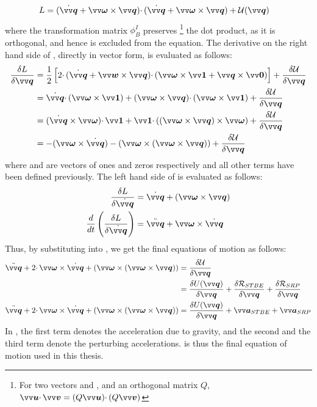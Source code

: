 \begin{align}
    L &= (\dot{\bv{q}} + \bv{\omega} \times \bv{q}) \cdotp (\dot{\bv{q}} + \bv{\omega} \times \bv{q}) + \mathcal{U}(\bv{q})
    \label{eqn:lagrange_arf}
\end{align}
where the transformation matrix $\phi_B^I$ preserves \footnote{For two vectors  and , and an orthogonal matrix $Q$, $\bv{u} \cdotp \bv{v} = (Q\bv{u}) \cdotp (Q\bv{v})$} the dot product, as it is orthogonal, and hence is excluded from the equation. The derivative on the right hand side of , directly in vector form, is evaluated as follows:
\begin{align}
    \frac{\delta L}{\delta \bv{q}} &= \frac{1}{2} \left[ 2 \cdotp (\dot{\bv{q}} + \bv{w} \times \bv{q}) \cdotp (\bv{\omega} \times \bv{1} + \bv{q} \times {\bv{0}}) \right] + \frac{\delta \mathcal{U}}{\delta \bv{q}} \\
    &= \dot{\bv{q}} \cdotp (\bv{\omega} \times \bv{1}) + (\bv{\omega} \times \bv{q}) \cdotp (\bv{\omega} \times \bv{1}) + \frac{\delta \mathcal{U}}{\delta \bv{q}} \\
    &= (\dot{\bv{q}} \times \bv{\omega}) \cdotp \bv{1} + \bv{1} \cdotp ((\bv{\omega} \times \bv{q}) \times \bv{\omega}) + \frac{\delta \mathcal{U}}{\delta \bv{q}} \\
    &= -(\bv{\omega} \times \dot{\bv{q}}) - (\bv{\omega} \times (\bv{\omega} \times \bv{q})) + \frac{\delta \mathcal{U}}{\delta \bv{q}}
    \label{eqn:lagrangian_RHS}
\end{align}
where  and  are vectors of ones and zeros respectively and all other terms have been defined previously. The left hand side of  is evaluated as follows:
\begin{align}
    \frac{\delta L}{\delta \dot{\bv{q}}} &= \dot{\bv{q}} + (\bv{\omega} \times \bv{q}) \\
    \frac{d}{dt}\left( \frac{\delta L}{\delta \dot{\bv{q}}} \right) &= \ddot{\bv{q}} + \bv{\omega} \times \dot{\bv{q}}
    \label{eqn:lagrangian_LHS}
\end{align}
Thus, by substituting  into , we get the final equations of motion as follows:
\begin{align}
    \ddot{\bv{q}} + 2 \cdotp \bv{\omega} \times \dot{\bv{q}} + (\bv{\omega} \times (\bv{\omega} \times \bv{q})) &= \frac{\delta \mathcal{U}}{\delta \bv{q}} \\
    &= \frac{\delta U(\bv{q})}{\delta \bv{q}} + \frac{\delta \mathcal{R}_{STBE}}{\delta \bv{q}} + \frac{\delta \mathcal{R}_{SRP}}{\delta \bv{q}}
    \label{eqn:lagrangian_potential_eval} \\
    \ddot{\bv{q}} + 2 \cdotp \bv{\omega} \times \dot{\bv{q}} + (\bv{\omega} \times (\bv{\omega} \times \bv{q})) &= \frac{\delta U(\bv{q})}{\delta \bv{q}} + \bv{a}_{STBE} + \bv{a}_{SRP}
    \label{eqn:p2bp}
\end{align}
In , the first term denotes the acceleration due to gravity, and the second and the third term denote the perturbing accelerations.  is thus the final equation of motion used in this thesis.

